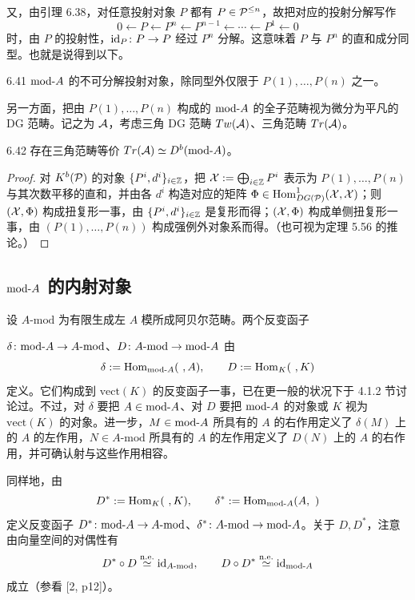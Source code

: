 又，由引理 6.38，对任意投射对象 $P$ 都有 $P\in\mathcal{P}^{\le n}$，故把对应的投射分解写作
\[
0\leftarrow P\leftarrow P^{n}\leftarrow P^{n-1}\leftarrow\cdots\leftarrow P^{1}\leftarrow 0
\]
时，由 $P$ 的投射性，$\mathrm{id}_P\colon P\to P$ 经过 $P^{n}$ 分解。这意味着 $P$ 与 $P^{n}$ 的直和成分同型。也就是说得到以下。

\begin{corollary}{6.41}
$\mathrm{mod}\text{-}A$ 的不可分解投射对象，除同型外仅限于 $P(1),\dots,P(n)$ 之一。
\end{corollary}

另一方面，把由 $P(1),\dots,P(n)$ 构成的 $\mathrm{mod}\text{-}A$ 的全子范畴视为微分为平凡的 DG 范畴。记之为 $\mathcal{A}$，考虑三角 DG 范畴 $Tw(\mathcal{A})$、三角范畴 $Tr(\mathcal{A})$。

\begin{corollary}{6.42}
存在三角范畴等价 $Tr(\mathcal{A})\simeq D^{b}(\mathrm{mod}\text{-}A)$。
\end{corollary}

\begin{proof}
对 $K^{b}(\mathcal{P})$ 的对象 $\{P^{i},d^{i}\}_{i\in\mathbb{Z}}$，把 $\mathcal{X}:=\bigoplus_{i\in\mathbb{Z}}P^{i}$ 表示为 $P(1),\dots,P(n)$ 与其次数平移的直和，并由各 $d^{i}$ 构造对应的矩阵 $\Phi\in\operatorname{Hom}^{1}_{DG(\mathcal{P})}(\mathcal{X},\mathcal{X})$；则 $(\mathcal{X},\Phi)$ 构成扭复形一事，由 $\{P^{i},d^{i}\}_{i\in\mathbb{Z}}$ 是复形而得；$(\mathcal{X},\Phi)$ 构成单侧扭复形一事，由 $(P(1),\dots,P(n))$ 构成强例外对象系而得。（也可视为定理 5.56 的推论。）
\end{proof}

\subsection{$\mathrm{mod}\text{-}A$ 的内射对象}

设 $A\text{-}\mathrm{mod}$ 为有限生成左 $A$ 模所成阿贝尔范畴。两个反变函子

$\delta\colon\mathrm{mod}\text{-}A\to A\text{-}\mathrm{mod}$、$D\colon A\text{-}\mathrm{mod}\to\mathrm{mod}\text{-}A$ 由
\[
\delta:=\Hom_{\modA}(\ ,A),\qquad D:=\Hom_K(\ ,K)
\]
定义。它们构成到 $\mathrm{vect}(K)$ 的反变函子一事，已在更一般的状况下于 4.1.2 节讨论过。不过，对 $\delta$ 要把 $A\in\mathrm{mod}\text{-}A$、对 $D$ 要把 $\mathrm{mod}\text{-}A$ 的对象或 $K$ 视为 $\mathrm{vect}(K)$ 的对象。进一步，$M\in\mathrm{mod}\text{-}A$ 所具有的 $A$ 的右作用定义了 $\delta(M)$ 上的 $A$ 的左作用，$N\in A\text{-}\mathrm{mod}$ 所具有的 $A$ 的左作用定义了 $D(N)$ 上的 $A$ 的右作用，并可确认射与这些作用相容。

同样地，由
\[
D^{*}:=\operatorname{Hom}_K(\ ,K),\qquad \delta^{*}:=\operatorname{Hom}_{\mathrm{mod}\text{-}A}(A,\ )
\]
定义反变函子 $D^{*}\colon\mathrm{mod}\text{-}A\to A\text{-}\mathrm{mod}$、$\delta^{*}\colon A\text{-}\mathrm{mod}\to\mathrm{mod}\text{-}A$。关于 $D,D^{*}$，注意由向量空间的对偶性有
\[
D^{*}\circ D\overset{\mathrm{n.e.}}{\simeq}\mathrm{id}_{A\text{-}\mathrm{mod}},\qquad
D\circ D^{*}\overset{\mathrm{n.e.}}{\simeq}\mathrm{id}_{\mathrm{mod}\text{-}A}
\]
成立（参看 [2, p12]）。

